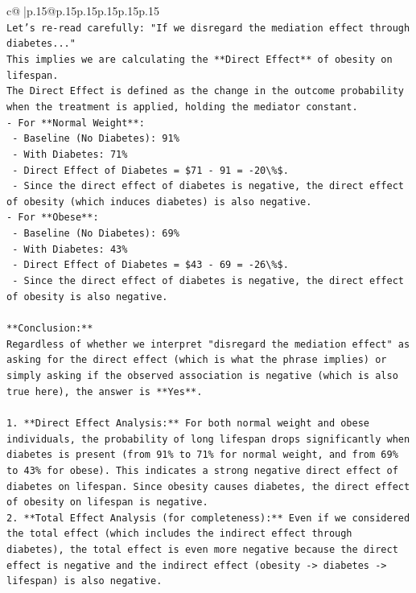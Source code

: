 \documentclass{article}
\begin{document}
{\begin{supertabular}{c@{$\;$}|p{.15\linewidth}@{}p{.15\linewidth}p{.15\linewidth}p{.15\linewidth}p{.15\linewidth}p{.15\linewidth}}
{{{\\ 
\texttt{Let's re{-}read carefully: "If we disregard the mediation effect through diabetes..."} \\
\texttt{This implies we are calculating the **Direct Effect** of obesity on lifespan.} \\
\texttt{The Direct Effect is defined as the change in the outcome probability when the treatment is applied, holding the mediator constant.} \\
\texttt{{-} For **Normal Weight**:} \\
\texttt{    {-} Baseline (No Diabetes): 91\%} \\
\texttt{    {-} With Diabetes: 71\%} \\
\texttt{    {-} Direct Effect of Diabetes = \$71 {-} 91 = {-}20\textbackslash{}\%\$.} \\
\texttt{    {-} Since the direct effect of diabetes is negative, the direct effect of obesity (which induces diabetes) is also negative.} \\
\texttt{{-} For **Obese**:} \\
\texttt{    {-} Baseline (No Diabetes): 69\%} \\
\texttt{    {-} With Diabetes: 43\%} \\
\texttt{    {-} Direct Effect of Diabetes = \$43 {-} 69 = {-}26\textbackslash{}\%\$.} \\
\texttt{    {-} Since the direct effect of diabetes is negative, the direct effect of obesity is also negative.} \\
\\ 
\texttt{**Conclusion:**} \\
\texttt{Regardless of whether we interpret "disregard the mediation effect" as asking for the direct effect (which is what the phrase implies) or simply asking if the observed association is negative (which is also true here), the answer is **Yes**.} \\
\\ 
\texttt{1.  **Direct Effect Analysis:** For both normal weight and obese individuals, the probability of long lifespan drops significantly when diabetes is present (from 91\% to 71\% for normal weight, and from 69\% to 43\% for obese). This indicates a strong negative direct effect of diabetes on lifespan. Since obesity causes diabetes, the direct effect of obesity on lifespan is negative.} \\
\texttt{2.  **Total Effect Analysis (for completeness):** Even if we considered the total effect (which includes the indirect effect through diabetes), the total effect is even more negative because the direct effect is negative and the indirect effect (obesity {-}> diabetes {-}> lifespan) is also negative.} \\
}}}
\end{supertabular}}
\end{document}

